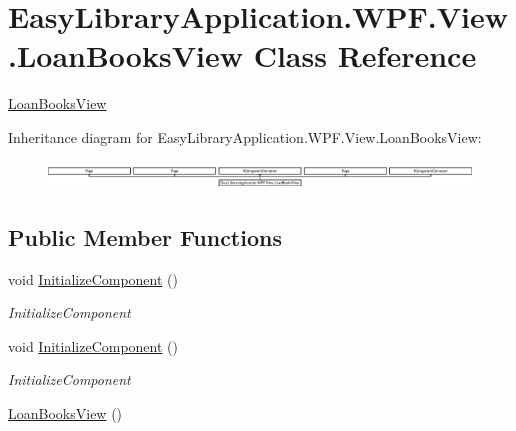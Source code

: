 \hypertarget{class_easy_library_application_1_1_w_p_f_1_1_view_1_1_loan_books_view}{}\section{Easy\+Library\+Application.\+W\+P\+F.\+View.\+Loan\+Books\+View Class Reference}
\label{class_easy_library_application_1_1_w_p_f_1_1_view_1_1_loan_books_view}


\mbox{\hyperlink{class_easy_library_application_1_1_w_p_f_1_1_view_1_1_loan_books_view}{Loan\+Books\+View}}  


Inheritance diagram for Easy\+Library\+Application.\+W\+P\+F.\+View.\+Loan\+Books\+View\+:\begin{figure}[H]
\begin{center}
\leavevmode
\includegraphics[height=0.724919cm]{class_easy_library_application_1_1_w_p_f_1_1_view_1_1_loan_books_view}
\end{center}
\end{figure}
\subsection*{Public Member Functions}
\begin{DoxyCompactItemize}
\item 
void \mbox{\hyperlink{class_easy_library_application_1_1_w_p_f_1_1_view_1_1_loan_books_view_a357ad1df4fc512de3f3e7490b2775d81}{Initialize\+Component}} ()
\begin{DoxyCompactList}\small\item\em Initialize\+Component \end{DoxyCompactList}\item 
void \mbox{\hyperlink{class_easy_library_application_1_1_w_p_f_1_1_view_1_1_loan_books_view_a357ad1df4fc512de3f3e7490b2775d81}{Initialize\+Component}} ()
\begin{DoxyCompactList}\small\item\em Initialize\+Component \end{DoxyCompactList}\item 
\mbox{\hyperlink{class_easy_library_application_1_1_w_p_f_1_1_view_1_1_loan_books_view_a16621c35df9acc1d2896db14a161aec7}{Loan\+Books\+View}} ()
\end{DoxyCompactItemize}


